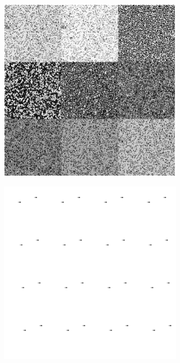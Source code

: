 \documentclass[12pt]{article}
\numberwithin{figure}{section} %
\begin{document}
\begin{figure}[H]
	\begin{subfigure}{0.45\textwidth}
     		\centering
     		\includegraphics[width=\linewidth]{Section3/3.1}
   	\end{subfigure}
     	\begin{subfigure}{0.53\textwidth}
     		\centering
     		\includegraphics[width=\linewidth]{Section3/3.2}

\end{subfigure}
\end{figure}
\end{document}

